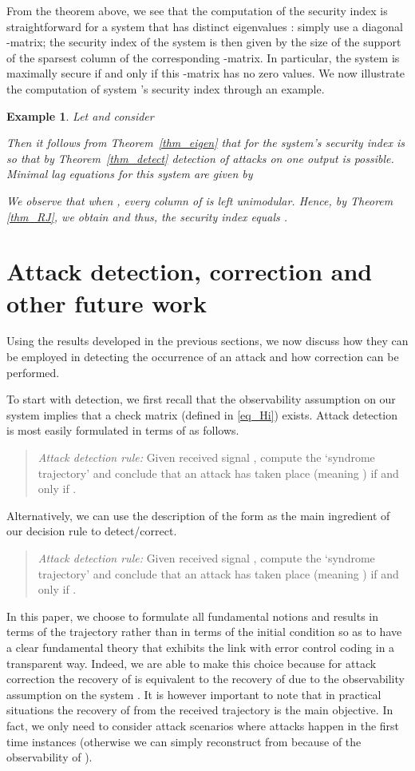\documentclass[letterpaper, 10 pt, conference]{ieeeconf}
\newtheorem{example}[thm]{Example}
\begin{document}
From the theorem above, we see that the computation of the security index is straightforward for a system that has  distinct eigenvalues : simply use a diagonal -matrix; the security index of the system is then given by the size of the support of the sparsest column of the corresponding -matrix.  In particular, the system is maximally secure if and only if this -matrix has no zero values. We now illustrate the computation of system 's security index through an example. 
\begin{example}
Let  and consider

Then it follows from Theorem~\ref{thm_eigen} that for  the system's security index is  so that by Theorem~\ref{thm_detect} detection of attacks on one output is possible. Minimal lag equations for this system are given by

We observe that when , every column of  is left unimodular. Hence, by Theorem \ref{thm_RJ}, we obtain  and thus, the security index  equals .
\end{example}


\section{Attack detection, correction and other future work}
Using the results developed in the previous sections, we now discuss how they can be employed in detecting the occurrence of an attack and how correction can be performed.

To start with detection, we first recall that the observability assumption on our system implies that a check matrix  (defined in \eqref{eq_Hi}) exists. Attack detection is most easily formulated in terms of  as follows.

\begin{quote} 
{\em Attack detection rule:} Given received signal , compute the `syndrome trajectory'  and conclude that an attack has taken place (meaning ) if and only if . 
\end{quote}

Alternatively, we can use the description of the form  as the main ingredient of our decision rule to detect/correct.   
\begin{quote}
{\em Attack detection rule:} Given received signal , compute the `syndrome trajectory'  and conclude that an attack has taken place (meaning ) if and only if . 
\end{quote}
In this paper, we choose to formulate all fundamental notions and results in terms of the trajectory  rather than in terms of the initial condition  so as to have a clear fundamental theory that exhibits the link with error control coding in a transparent way.  Indeed, we are able to make this choice because for attack correction the recovery of  is equivalent to the recovery of  due to the observability assumption on the system . It is however important to note that in practical situations the recovery of  from the received trajectory  is the main objective. In fact, we only need to consider attack scenarios where attacks happen in the first  time instances (otherwise we can simply reconstruct  from  because of the observability of ).
\end{document}
